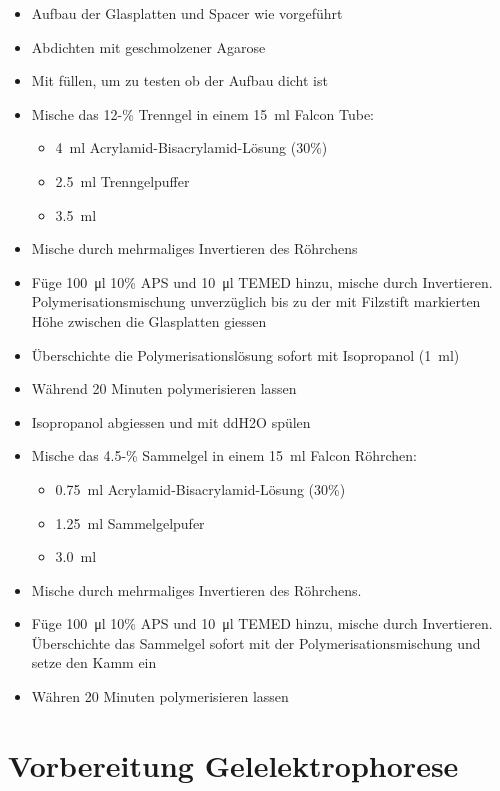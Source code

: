 \documentclass[a4paper,german]{scrreprt}
\begin{document}
\begin{itemize}
	\item Aufbau der Glasplatten und Spacer wie vorgeführt
	\item Abdichten mit geschmolzener Agarose
	\item Mit  füllen, um zu testen ob der Aufbau dicht ist
	\item Mische das 12-\% Trenngel in einem \SI{15}{\ml} Falcon Tube:
		\begin{itemize}
			\item \SI{4}{\ml} Acrylamid-Bisacrylamid-Lösung (30\%)
			\item \SI{2.5}{\ml} Trenngelpuffer
			\item \SI{3.5}{\ml} 
		\end{itemize}
	\item Mische durch mehrmaliges Invertieren des Röhrchens
	\item Füge \SI{100}{\ul} 10\% APS und \SI{10}{\ul} TEMED hinzu, mische durch
		Invertieren. Polymerisationsmischung unverzüglich bis zu der
		mit Filzstift markierten Höhe zwischen die Glasplatten giessen
	\item Überschichte die Polymerisationslösung sofort mit Isopropanol (\SI{1}{\ml})
	\item Während 20 Minuten polymerisieren lassen
	\item Isopropanol abgiessen und mit ddH2O spülen
	\item Mische das 4.5-\% Sammelgel in einem \SI{15}{ml} Falcon Röhrchen:
		\begin{itemize}
			\item \SI{0.75}{\ml} Acrylamid-Bisacrylamid-Lösung (30\%)
			\item \SI{1.25}{\ml} Sammelgelpufer
			\item \SI{3.0}{\ml} 
		\end{itemize}
	\item Mische durch mehrmaliges Invertieren des Röhrchens.
	\item Füge \SI{100}{\ul} 10\% APS und \SI{10}{\ul} TEMED hinzu, mische
		durch Invertieren. Überschichte das Sammelgel sofort mit der
		Polymerisationsmischung und setze den Kamm ein
	\item Währen 20 Minuten polymerisieren lassen
\end{itemize}

\section{Vorbereitung Gelelektrophorese}
\end{document}
